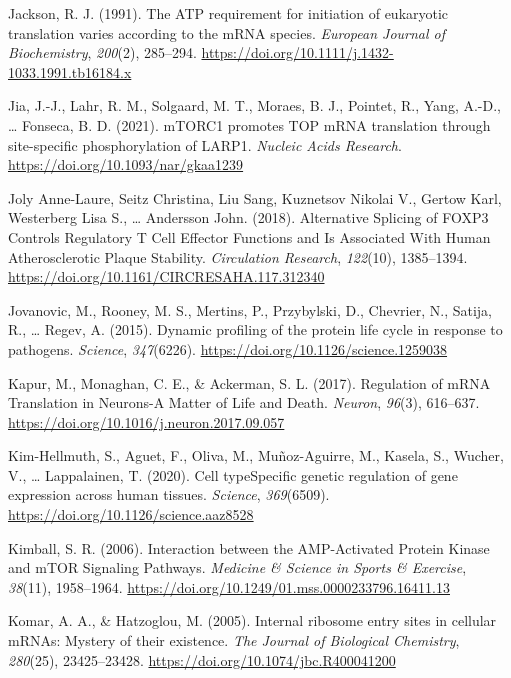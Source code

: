 \documentclass[12pt,openany]{book}
\begin{document}
\hypertarget{ref-Jackson1991}{}
Jackson, R. J. (1991). The ATP requirement for initiation of eukaryotic
translation varies according to the mRNA species. \emph{European Journal
of Biochemistry}, \emph{200}(2), 285--294.
\url{https://doi.org/10.1111/j.1432-1033.1991.tb16184.x}

\hypertarget{ref-Jia2021}{}
Jia, J.-J., Lahr, R. M., Solgaard, M. T., Moraes, B. J., Pointet, R.,
Yang, A.-D., \ldots{} Fonseca, B. D. (2021). mTORC1 promotes TOP mRNA
translation through site-specific phosphorylation of LARP1.
\emph{Nucleic Acids Research}.
\url{https://doi.org/10.1093/nar/gkaa1239}

\hypertarget{ref-JolyAnne-Laure2018}{}
Joly Anne-Laure, Seitz Christina, Liu Sang, Kuznetsov Nikolai V., Gertow
Karl, Westerberg Lisa S., \ldots{} Andersson John. (2018). Alternative
Splicing of FOXP3 Controls Regulatory T Cell Effector Functions and Is
Associated With Human Atherosclerotic Plaque Stability.
\emph{Circulation Research}, \emph{122}(10), 1385--1394.
\url{https://doi.org/10.1161/CIRCRESAHA.117.312340}

\hypertarget{ref-Jovanovic2015}{}
Jovanovic, M., Rooney, M. S., Mertins, P., Przybylski, D., Chevrier, N.,
Satija, R., \ldots{} Regev, A. (2015). Dynamic profiling of the protein
life cycle in response to pathogens. \emph{Science}, \emph{347}(6226).
\url{https://doi.org/10.1126/science.1259038}

\hypertarget{ref-Kapur2017}{}
Kapur, M., Monaghan, C. E., \& Ackerman, S. L. (2017). Regulation of
mRNA Translation in Neurons-A Matter of Life and Death. \emph{Neuron},
\emph{96}(3), 616--637.
\url{https://doi.org/10.1016/j.neuron.2017.09.057}

\hypertarget{ref-Kim-Hellmuth2020}{}
Kim-Hellmuth, S., Aguet, F., Oliva, M., Muñoz-Aguirre, M., Kasela, S.,
Wucher, V., \ldots{} Lappalainen, T. (2020). Cell typeSpecific genetic
regulation of gene expression across human tissues. \emph{Science},
\emph{369}(6509). \url{https://doi.org/10.1126/science.aaz8528}

\hypertarget{ref-Kimball2006}{}
Kimball, S. R. (2006). Interaction between the AMP-Activated Protein
Kinase and mTOR Signaling Pathways. \emph{Medicine \& Science in Sports
\& Exercise}, \emph{38}(11), 1958--1964.
\url{https://doi.org/10.1249/01.mss.0000233796.16411.13}

\hypertarget{ref-Komar2005}{}
Komar, A. A., \& Hatzoglou, M. (2005). Internal ribosome entry sites in
cellular mRNAs: Mystery of their existence. \emph{The Journal of
Biological Chemistry}, \emph{280}(25), 23425--23428.
\url{https://doi.org/10.1074/jbc.R400041200}
\end{document}
